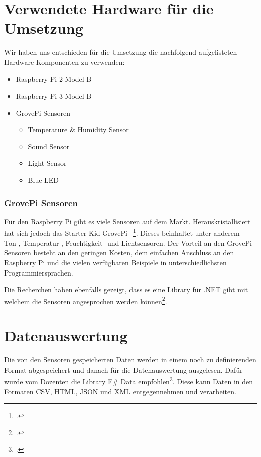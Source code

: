 \section{Verwendete Hardware für die Umsetzung}
Wir haben uns entschieden für die Umsetzung die nachfolgend aufgelisteten Hardware-Komponenten zu verwenden:
\begin{itemize}
\item Raspberry Pi 2 Model B
\item Raspberry Pi 3 Model B
\item GrovePi Sensoren
\begin{itemize}
\item Temperature \& Humidity Sensor
\item Sound Sensor
\item Light Sensor
\item Blue LED
\end{itemize}
\end{itemize}


\subsubsection{GrovePi Sensoren}
Für den Raspberry Pi gibt es viele Sensoren auf dem Markt. Herauskristallisiert hat sich jedoch das Starter Kid GrovePi+\footcite{GrovePi_2016-04-24}. Dieses beinhaltet unter anderem Ton-, Temperatur-, Feuchtigkeit- und Lichtsensoren. Der Vorteil an den GrovePi Sensoren besteht an den geringen Kosten, dem einfachen Anschluss an den Raspberry Pi und die vielen verfügbaren Beispiele in unterschiedlichsten Programmiersprachen.

Die Recherchen haben ebenfalls gezeigt, dass es eine Library für .NET gibt mit welchem die Sensoren angesprochen werden können\footcite{NuGet_GrovePi_2016-04-24}.



\section{Datenauswertung}
Die von den Sensoren gespeicherten Daten werden in einem noch zu definierenden Format abgespeichert und danach für die Datenauswertung ausgelesen. Dafür wurde vom Dozenten die Library F\# Data empfohlen\footcite{Fsharp_Data_2016-04-24}. Diese kann Daten in den Formaten CSV, HTML, JSON und XML entgegennehmen und verarbeiten.



